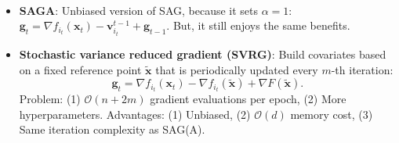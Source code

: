 \documentclass[8pt,a4paper]{extarticle}
\newcommand{\lft}{\mathopen{}\mathclose\bgroup\left}
\newcommand{\rgt}{\aftergroup\egroup\right}
\newcommand{\E}{\mathbb{E}}
\renewcommand{\vec}[1]{\bm{#1}}
\newenvironment{topic}[1]
{\textbf{\sffamily \colorbox{black}{\rlap{\textbf{\textcolor{white}{#1}}}\hspace{\linewidth}\hspace{-2\fboxsep}}} \\ \vspace{0.2cm}}
{}
\begin{document}
\begin{multicols*}{2}
\begin{topic}{Variance reduction}
\begin{itemize}
\begin{itemize}
                            Each iteration we update $\vec{v}_i^t$ by \[
                                \vec{v}_i^t =
                                \begin{cases}
                                    \nabla f_{i_t}(\vec{x}_t) & i = i_t     \\
                                    \vec{v}_i^{t-1}           & i \neq i_t.
                                \end{cases}
                            \]
                            Thus, we have $\alpha=\frac{1}{n}$, $Y = \vec{v}_{i_t}^{t-1}$, and $\E[Y] = \vec{g}_{t-1}$, \[
                                \vec{g}_t = \frac{1}{n} \lft( \nabla f_{i_t}(\vec{x}_t) - \vec{v}_{i_t}^{t-1} \rgt) + \vec{g}_{t-1}.
                            \]
                            Problem: (1) $\mathcal{O}(nd)$ storage, (2) biased $\alpha \neq 1$. Advantage:
                            $\mathcal{O}((n+\kappa_{\max} \log \frac{1}{\epsilon}))$ iteration complexity, where $\kappa_{\max}
                                = \max_{i \in [n]} \frac{L_i}{\mu}$.
                      \item \textbf{SAGA}: Unbiased version of SAG, because it sets $\alpha=1$: $\vec{g}_t = \nabla f_{i_t}(\vec{x}_t) - \vec{v}_{i_t}^{t-1} + \vec{g}_{t-1}$. But, it still enjoys the same benefits.
                      \item \textbf{Stochastic variance reduced gradient (SVRG)}: Build covariates based on a fixed reference point $\tilde{\vec{x}}$ that is periodically updated every $m$-th iteration: \[
                                \vec{g}_t = \nabla f_{i_t}(\vec{x}_t) - \nabla f_{i_t}(\tilde{\vec{x}}) + \nabla F(\tilde{\vec{x}}).
                            \]
                            Problem: (1) $\mathcal{O}(n+2m)$ gradient evaluations per epoch, (2) More hyperparameters.
                            Advantages: (1) Unbiased, (2) $\mathcal{O}(d)$ memory cost, (3) Same iteration complexity as
                            SAG(A).
                  \end{itemize}
        \end{itemize}
    \end{topic}


\end{multicols*}
\end{document}
